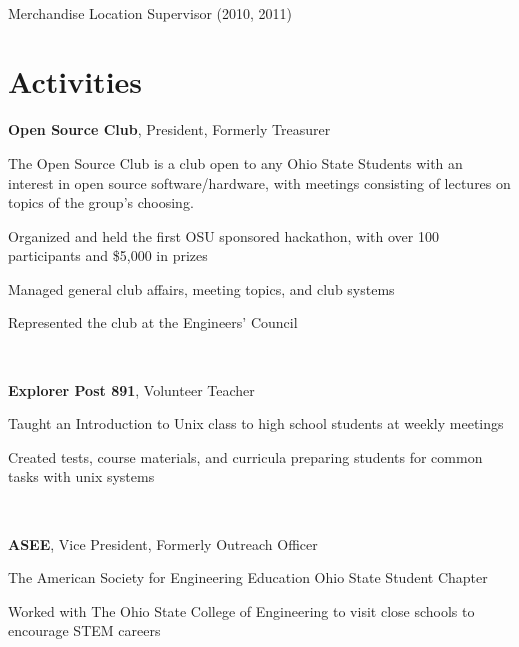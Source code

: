 \documentclass[letterpaper]{resume}
\begin{document}
~

Merchandise Location Supervisor (2010, 2011)

%

\section{Activities}

\textbf{Open Source Club}, President, Formerly Treasurer
\begin{compactitem}
\item The Open Source Club is a club open to any Ohio State Students with an interest in open source software/hardware, with meetings consisting of lectures on topics of the group's choosing.
\item Organized and held the first OSU sponsored hackathon, with over 100 participants and \$5,000 in prizes
\item Managed general club affairs, meeting topics, and club systems
\item Represented the club at the Engineers' Council
\end{compactitem}

~

\textbf{Explorer Post 891}, Volunteer Teacher
\begin{compactitem}
\item Taught an Introduction to Unix class to high school students at
	weekly meetings
\item Created tests, course materials, and curricula preparing students
	for common tasks with unix systems
\end{compactitem}

~

\textbf{ASEE}, Vice President, Formerly Outreach Officer
\begin{compactitem}
\item The American Society for Engineering Education Ohio State Student Chapter
\item Worked with The Ohio State College of Engineering to visit close schools to encourage STEM careers
\end{compactitem}
\end{document}
